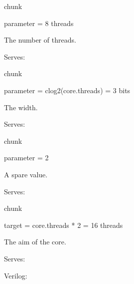 \documentclass[letterpaper,10pt,english]{sphinxmanual}
\begin{document}
\begin{sphinxuseclass}{chunk}
\begin{sphinxuseclass}{parameter}\label{\detokenize{core/core:core.threads}}
\sphinxAtStartPar
{}  = 8 threads

\sphinxAtStartPar
The number of threads.

\sphinxAtStartPar
Serves: {\hyperref[\detokenize{core/core:core.core}]{}}

\end{sphinxuseclass}
\end{sphinxuseclass}
\begin{sphinxuseclass}{chunk}
\begin{sphinxuseclass}{parameter}\label{\detokenize{core/core:core.turn-width}}
\sphinxAtStartPar
{}  = clog2(core.threads) = 3 bits

\sphinxAtStartPar
The width.

\sphinxAtStartPar
Serves: {\hyperref[\detokenize{core/core:core.threads}]{}}

\end{sphinxuseclass}
\end{sphinxuseclass}
\begin{sphinxuseclass}{chunk}
\begin{sphinxuseclass}{parameter}\label{\detokenize{core/core:core.spare}}
\sphinxAtStartPar
{}  = 2

\sphinxAtStartPar
A spare value.

\sphinxAtStartPar
Serves: {\hyperref[\detokenize{core/core:core.core}]{}}

\end{sphinxuseclass}
\end{sphinxuseclass}
\begin{sphinxuseclass}{chunk}
\begin{sphinxuseclass}{target}\label{\detokenize{core/core:core.aim}}
\sphinxAtStartPar
{}  = core.threads * 2 = 16 threads

\sphinxAtStartPar
The aim of the core.

\sphinxAtStartPar
Serves: {\hyperref[\detokenize{core/core:core.threads}]{}}

\end{sphinxuseclass}
\end{sphinxuseclass}
\sphinxAtStartPar
Verilog: {\hyperref[\detokenize{core/core:source-2}]{}}
\end{document}
